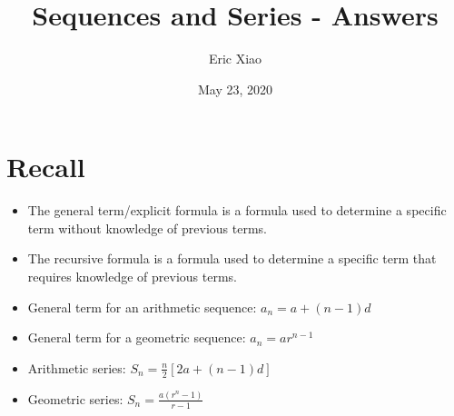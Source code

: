 \documentclass[12pt]{extarticle}
\title{Sequences and Series - Answers}
\author{Eric Xiao}
\date{May 23, 2020}
\begin{document}
\maketitle

\section{Recall}
\begin{itemize}
    \item {The general term/explicit formula is a formula used to determine a specific term without knowledge of previous terms.}
    \item {The recursive formula is a formula used to determine a specific term that requires knowledge of previous terms.}
    \item {General term for an arithmetic sequence: $a_n = a + (n - 1)d$}
    \item {General term for a geometric sequence: $a_n = ar^{n-1}$}
    \item {Arithmetic series: $S_n = \frac{n}{2}[2a + (n - 1)d]$}
    \item {Geometric series: $S_n = \frac{a(r^n - 1)}{r - 1}$}
\end{itemize}
\end{document}
